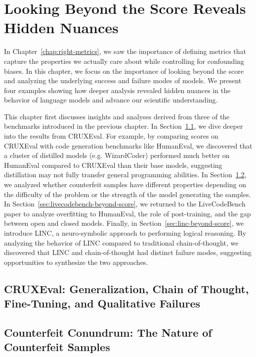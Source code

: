 \chapter{Looking Beyond the Score Reveals Hidden Nuances}
\label{chap:beyond-score}

In Chapter~\ref{chap:right-metrics}, we saw the importance of defining metrics
that capture the properties we actually care about while controlling for confounding biases.
In this chapter, we focus
on the importance of looking beyond the score and analyzing the underlying success and failure
modes of models. We present four examples showing how deeper analysis revealed hidden nuances
in the behavior of language models and advance our scientific understanding.

This chapter first discusses insights and analyses derived from three of the benchmarks
introduced in the previous chapter. In Section~\ref{sec:cruxeval-beyond-score}, we dive deeper into
the results from CRUXEval. For example, by comparing scores on CRUXEval with code generation benchmarks like HumanEval,
we discovered that a cluster of distilled models (e.g. WizardCoder) performed much better on HumanEval compared
to CRUXEval than their base models, suggesting distillation may not fully transfer general programming abilities.
In Section~\ref{sec:counterfeit-beyond-score}, we analyzed whether counterfeit samples have different
properties depending on the difficulty of the problem or the strength of the model generating the samples.
In Section~\ref{sec:livecodebench-beyond-score}, we returned to the LiveCodeBench paper to analyze
overfitting to HumanEval, the role of post-training, and the gap between open and closed models.
Finally, in Section~\ref{sec:linc-beyond-score}, we introduce LINC, a neuro-symbolic approach to performing
logical reasoning. By analyzing the behavior of LINC compared to traditional chain-of-thought,
we discovered that LINC and chain-of-thought had distinct failure modes, suggesting opportunities to
synthesize the two approaches.


\section{CRUXEval: Generalization, Chain of Thought, Fine-Tuning, and Qualitative Failures}
\label{sec:cruxeval-beyond-score}


\section{Counterfeit Conundrum: The Nature of Counterfeit Samples}
\label{sec:counterfeit-beyond-score}


